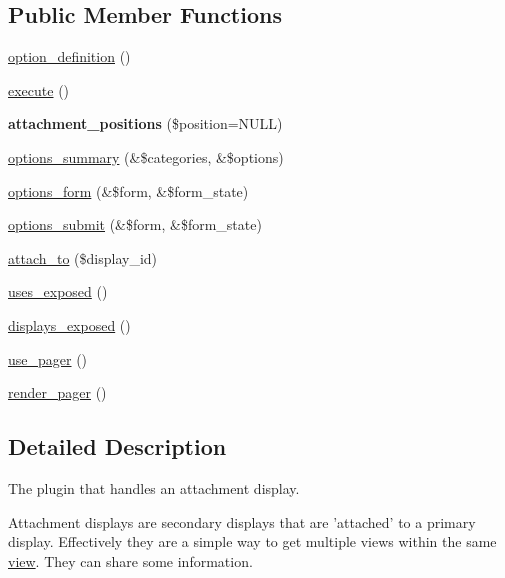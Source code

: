 \subsection*{Public Member Functions}
\begin{CompactItemize}
\item 
\hyperlink{classviews__plugin__display__attachment_fd104a6bde92eab82cd1a8e1b654179f}{option\_\-definition} ()
\item 
\hyperlink{classviews__plugin__display__attachment_5ca7a4fec7907cd236d0f73ac21f4e1e}{execute} ()
\item 
\hypertarget{classviews__plugin__display__attachment_3175bc94ea0fc7d796bec4670317ab23}{
\textbf{attachment\_\-positions} (\$position=NULL)}
\label{classviews__plugin__display__attachment_3175bc94ea0fc7d796bec4670317ab23}

\item 
\hyperlink{classviews__plugin__display__attachment_0d54f6bd68c3ebba7af03cd7ac722fe0}{options\_\-summary} (\&\$categories, \&\$options)
\item 
\hyperlink{classviews__plugin__display__attachment_82864b279fb83e8d9ebddc40bc2851fa}{options\_\-form} (\&\$form, \&\$form\_\-state)
\item 
\hyperlink{classviews__plugin__display__attachment_63219dfd2bfed59bdf1840d704d11799}{options\_\-submit} (\&\$form, \&\$form\_\-state)
\item 
\hyperlink{classviews__plugin__display__attachment_e8fcfc681cc9ff841ac5c0bdf1691b31}{attach\_\-to} (\$display\_\-id)
\item 
\hyperlink{classviews__plugin__display__attachment_f62963a58736c80a5750c87588fb093a}{uses\_\-exposed} ()
\item 
\hyperlink{classviews__plugin__display__attachment_a047b05c7d1e48bd2ec6c98a27720ebf}{displays\_\-exposed} ()
\item 
\hyperlink{classviews__plugin__display__attachment_0a08a465f715c107a2dfaf9bd5dd1538}{use\_\-pager} ()
\item 
\hyperlink{classviews__plugin__display__attachment_ecc79a155c6491a0c510568b07c97fb8}{render\_\-pager} ()
\end{CompactItemize}


\subsection{Detailed Description}
The plugin that handles an attachment display.

Attachment displays are secondary displays that are 'attached' to a primary display. Effectively they are a simple way to get multiple views within the same \hyperlink{classview}{view}. They can share some information. 

